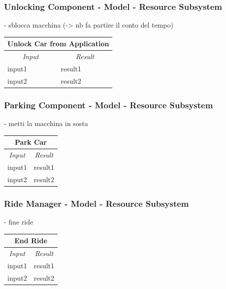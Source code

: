 \documentclass[english]{article}
\begin{document}
\subsubsection{Unlocking Component - Model - Resource Subsystem}
- sblocca macchina (-> nb fa partire il conto del tempo)

\begin{center}
	\begin{tabular}{ | m{6cm} | m{6cm} | }
		\hline 
		\multicolumn{2}{|c|}{\textbf{Unlock Car from Application}} \\
		\hline
		\multicolumn{1}{|c|}{\textit{Input}} & \multicolumn{1}{c|}{\textit{Result}} \\
		\hline
		input1 & result1 \\
		\hline
		input2 & result2 \\
		\hline
	\end{tabular}
\end{center}

\subsubsection{Parking Component - Model - Resource Subsystem}
- metti la macchina in sosta

\begin{center}
	\begin{tabular}{ | m{6cm} | m{6cm} | }
		\hline 
		\multicolumn{2}{|c|}{\textbf{Park Car}} \\
		\hline
		\multicolumn{1}{|c|}{\textit{Input}} & \multicolumn{1}{c|}{\textit{Result}} \\
		\hline
		input1 & result1 \\
		\hline
		input2 & result2 \\
		\hline
	\end{tabular}
\end{center}

\subsubsection{Ride Manager - Model - Resource Subsystem}
- fine ride

\begin{center}
	\begin{tabular}{ | m{6cm} | m{6cm} | }
		\hline 
		\multicolumn{2}{|c|}{\textbf{End Ride}} \\
		\hline
		\multicolumn{1}{|c|}{\textit{Input}} & \multicolumn{1}{c|}{\textit{Result}} \\
		\hline
		input1 & result1 \\
		\hline
		input2 & result2 \\
		\hline
	\end{tabular}
\end{center}
\end{document}
